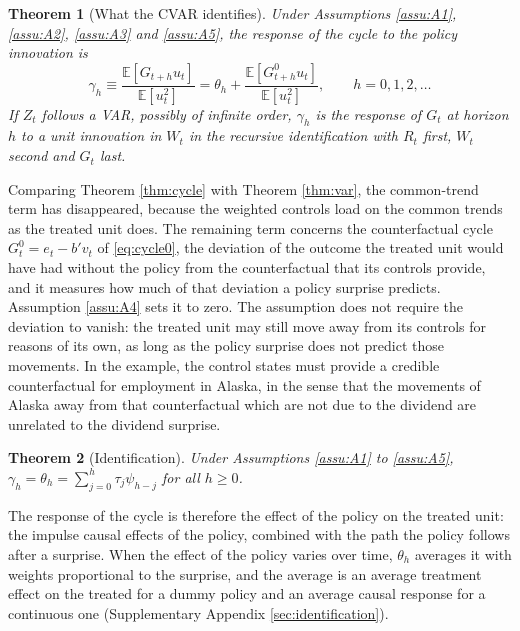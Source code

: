 \documentclass[12pt,a4paper]{article}
\newtheorem{thm}{Theorem}
\theoremstyle{definition}
\theoremstyle{definition}\newtheorem{example}{Example}
\theoremstyle{definition}\newtheorem{definition}{Definition}
\newcommand{\E}{\mathbb{E}}
\begin{document}
\begin{thm}[What the CVAR identifies\label{thm:cycle}]
Under Assumptions \ref{assu:A1}, \ref{assu:A2}, \ref{assu:A3} and \ref{assu:A5}, the response of the cycle to the policy innovation is
\begin{equation}
\gamma_h\equiv\frac{\E[G_{t+h}u_t]}{\E[u_t^2]}=\theta_h+\frac{\E[G^0_{t+h}u_t]}{\E[u_t^2]},\qquad h=0,1,2,\dots
\label{eq:cyclebias}
\end{equation}
If $Z_t$ follows a VAR, possibly of infinite order, $\gamma_h$ is the response of $G_t$ at horizon $h$ to a unit innovation in $W_t$ in the recursive identification with $R_t$ first, $W_t$ second and $G_t$ last.
\end{thm}

Comparing Theorem \ref{thm:cycle} with Theorem \ref{thm:var}, the common-trend term has disappeared, because the weighted controls load on the common trends as the treated unit does. The remaining term concerns the counterfactual cycle $G^0_t=e_t-b'v_t$ of \eqref{eq:cycle0}, the deviation of the outcome the treated unit would have had without the policy from the counterfactual that its controls provide, and it measures how much of that deviation a policy surprise predicts. Assumption \ref{assu:A4} sets it to zero. The assumption does not require the deviation to vanish: the treated unit may still move away from its controls for reasons of its own, as long as the policy surprise does not predict those movements. In the example, the control states must provide a credible counterfactual for employment in Alaska, in the sense that the movements of Alaska away from that counterfactual which are not due to the dividend are unrelated to the dividend surprise.

\begin{thm}[Identification\label{thm:ident}]
Under Assumptions \ref{assu:A1} to \ref{assu:A5}, $\gamma_h=\theta_h=\sum_{j=0}^h\tau_j\psi_{h-j}$ for all $h\geq0$.
\end{thm}

The response of the cycle is therefore the effect of the policy on the treated unit: the impulse causal effects of the policy, combined with the path the policy follows after a surprise. When the effect of the policy varies over time, $\theta_h$ averages it with weights proportional to the surprise, and the average is an average treatment effect on the treated for a dummy policy and an average causal response for a continuous one (Supplementary Appendix \ref{sec:identification}).
\end{document}
